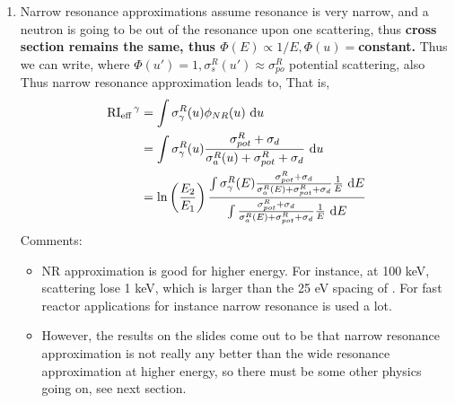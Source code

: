 \documentclass{school-22.211-notes}
\begin{document}
\begin{enumerate}
\item Narrow resonance approximations assume resonance is very narrow, and a neutron is going to be out of the resonance upon one scattering, thus \textbf{cross section remains the same, thus $\Phi(E) \propto 1/E, \Phi(u) = $constant.} Thus we can write, 
where $\Phi(u') = 1, \sigma_{s}^R (u')\approx \sigma_{po}^R$ potential scattering, also 
Thus narrow resonance approximation leads to, 
That is, 
\begin{align}
\left. \mathrm{RI}_{\mathrm{eff}} \right.^{\gamma} &= \int \sigma_{\gamma}^R (u) \phi_{NR} (u) \mbox{ }\mathrm{d} u \\
&= \int \sigma_{\gamma}^R (u) \frac{\sigma_{pot}^R + \sigma_d}{\sigma_a^R(u) + \sigma_{pot}^R + \sigma_d} \mbox{ }\mathrm{d} u \\
&= \ln\left( \frac{E_2}{E_1} \right) \frac{ \int \sigma_{\gamma}^R (E) \frac{\sigma_{pot}^R + \sigma_d}{\sigma_{a}^R(E) + \sigma_{pot}^R + \sigma_d} \frac{1}{E} \mbox{ }\mathrm{d} E}{ \int \frac{\sigma_{pot}^R + \sigma_d}{\sigma_{a}^R(E) + \sigma_{pot}^R + \sigma_d} \frac{1}{E} \mbox{ }\mathrm{d} E}
\end{align}
Comments:
\begin{itemize}
\item NR approximation is good for higher energy. For instance, at 100 keV, scattering lose 1 keV, which is larger than the 25 eV spacing of . For fast reactor applications for instance narrow resonance is used a lot. 

\item However, the results on the slides come out to be that narrow resonance approximation is not really any better than the wide resonance approximation at higher energy, so there must be some other physics going on, see next section. 
\end{itemize}
\end{enumerate}
\end{document}

